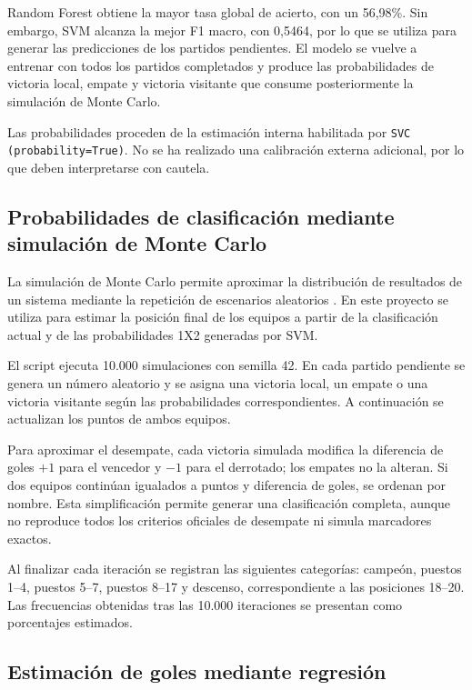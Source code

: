 Random Forest obtiene la mayor tasa global de acierto, con un 56,98\%. Sin embargo, SVM alcanza la mejor F1 macro, con 0,5464, por lo que se utiliza para generar las predicciones de los partidos pendientes. El modelo se vuelve a entrenar con todos los partidos completados y produce las probabilidades de victoria local, empate y victoria visitante que consume posteriormente la simulación de Monte Carlo.

Las probabilidades proceden de la estimación interna habilitada por \texttt{SVC (probability=True)}. No se ha realizado una calibración externa adicional, por lo que deben interpretarse con cautela.

\subsection{Probabilidades de clasificación mediante simulación de Monte Carlo}

La simulación de Monte Carlo permite aproximar la distribución de resultados de un sistema mediante la repetición de escenarios aleatorios \cite{stock_physics-based_2022}. En este proyecto se utiliza para estimar la posición final de los equipos a partir de la clasificación actual y de las probabilidades 1X2 generadas por SVM.

El script  ejecuta 10.000 simulaciones con semilla 42. En cada partido pendiente se genera un número aleatorio y se asigna una victoria local, un empate o una victoria visitante según las probabilidades correspondientes. A continuación se actualizan los puntos de ambos equipos.

Para aproximar el desempate, cada victoria simulada modifica la diferencia de goles $+1$ para el vencedor y $-1$ para el derrotado; los empates no la alteran. Si dos equipos continúan igualados a puntos y diferencia de goles, se ordenan por nombre. Esta simplificación permite generar una clasificación completa, aunque no reproduce todos los criterios oficiales de desempate ni simula marcadores exactos.

Al finalizar cada iteración se registran las siguientes categorías: campeón, puestos 1--4, puestos 5--7, puestos 8--17 y descenso, correspondiente a las posiciones 18--20. Las frecuencias obtenidas tras las 10.000 iteraciones se presentan como porcentajes estimados.

\subsection{Estimación de goles mediante regresión}

